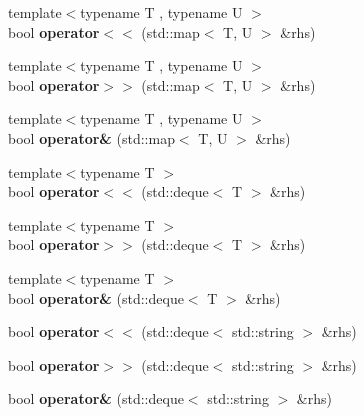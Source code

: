 \begin{DoxyCompactItemize}
\item 
\hypertarget{classBinaryStream_aaf43cee52c70268e098df62287114826}{{\footnotesize template$<$typename T , typename U $>$ }\\bool {\bfseries operator$<$$<$} (std\-::map$<$ T, U $>$ \&rhs)}\label{classBinaryStream_aaf43cee52c70268e098df62287114826}

\item 
\hypertarget{classBinaryStream_a1198ba811ea9b81e32bfd757253e3c5b}{{\footnotesize template$<$typename T , typename U $>$ }\\bool {\bfseries operator$>$$>$} (std\-::map$<$ T, U $>$ \&rhs)}\label{classBinaryStream_a1198ba811ea9b81e32bfd757253e3c5b}

\item 
\hypertarget{classBinaryStream_a67e220208d517aba27b88393abdd6f61}{{\footnotesize template$<$typename T , typename U $>$ }\\bool {\bfseries operator\&} (std\-::map$<$ T, U $>$ \&rhs)}\label{classBinaryStream_a67e220208d517aba27b88393abdd6f61}

\item 
\hypertarget{classBinaryStream_a477414ce94998ca75c85213c577f3a61}{{\footnotesize template$<$typename T $>$ }\\bool {\bfseries operator$<$$<$} (std\-::deque$<$ T $>$ \&rhs)}\label{classBinaryStream_a477414ce94998ca75c85213c577f3a61}

\item 
\hypertarget{classBinaryStream_aee6c9bf64e87b5409700b0528b00e7e6}{{\footnotesize template$<$typename T $>$ }\\bool {\bfseries operator$>$$>$} (std\-::deque$<$ T $>$ \&rhs)}\label{classBinaryStream_aee6c9bf64e87b5409700b0528b00e7e6}

\item 
\hypertarget{classBinaryStream_a22f187a7a8946216327ff1ab3b1cc1e5}{{\footnotesize template$<$typename T $>$ }\\bool {\bfseries operator\&} (std\-::deque$<$ T $>$ \&rhs)}\label{classBinaryStream_a22f187a7a8946216327ff1ab3b1cc1e5}

\item 
\hypertarget{classBinaryStream_abe970728b8a7ad30f95ac152f36e0885}{bool {\bfseries operator$<$$<$} (std\-::deque$<$ std\-::string $>$ \&rhs)}\label{classBinaryStream_abe970728b8a7ad30f95ac152f36e0885}

\item 
\hypertarget{classBinaryStream_a13827a06ad9d0321a30c8e4a460aefd1}{bool {\bfseries operator$>$$>$} (std\-::deque$<$ std\-::string $>$ \&rhs)}\label{classBinaryStream_a13827a06ad9d0321a30c8e4a460aefd1}

\item 
\hypertarget{classBinaryStream_a80b6b47ffd83d312c343556b9c52f0b8}{bool {\bfseries operator\&} (std\-::deque$<$ std\-::string $>$ \&rhs)}\label{classBinaryStream_a80b6b47ffd83d312c343556b9c52f0b8}

\end{DoxyCompactItemize}
